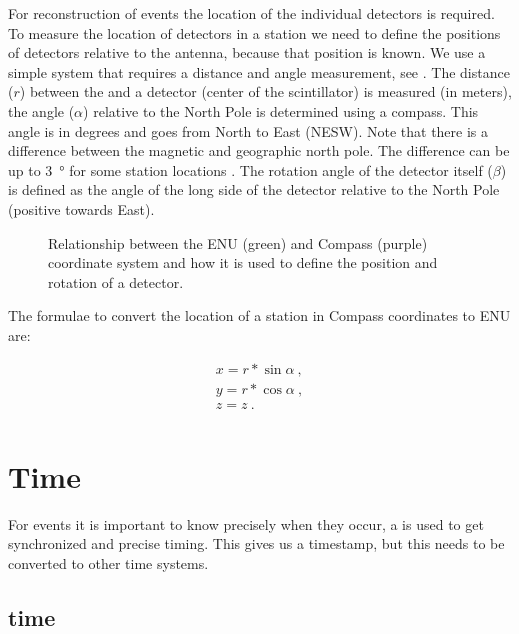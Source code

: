 For reconstruction of events the location of the individual detectors is
required. To measure the location of detectors in a station we need to
define the positions of detectors relative to the \gps antenna, because
that position is known. We use a simple system that requires a distance
and angle measurement, see . The distance ($r$)
between the \gps and a detector (center of the scintillator) is measured
(in meters), the angle ($\alpha$) relative to the North Pole is
determined using a compass. This angle is in degrees and goes from North
to East (NESW). Note that there is a difference between the magnetic and
geographic north pole. The difference can be up to \SI{3}{\degree} for
some \hisparc station locations \cite{canada:2013aa}. The rotation angle
of the detector itself ($\beta$) is defined as the angle of the long
side of the detector relative to the North Pole (positive towards East).

\begin{figure}
    \centering
    
    \caption{Relationship between the ENU (green) and Compass (purple)
             coordinate system and how it is used to define the position
             and rotation of a detector.}
    \label{fig:enu_compass}
\end{figure}

The formulae to convert the location of a station in Compass coordinates
to ENU are:

\begin{equation}
    \begin{array}{l}
        x = r * \sin{\alpha} \ , \\
        y = r * \cos{\alpha} \ , \\
        z = z \ . \\
    \end{array}
\end{equation}


\section{Time}

For \hisparc events it is important to know precisely when
they occur, a \gps is used to get synchronized and precise timing. This
gives us a timestamp, but this needs to be converted to other time
systems.


\subsection{\gps time}

